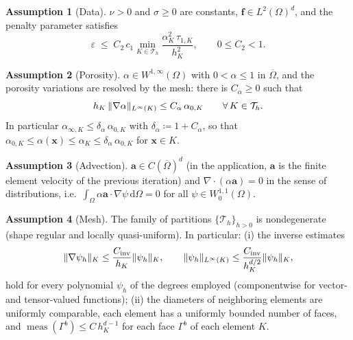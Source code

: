 \documentclass[11pt,a4paper]{article}
\newcommand{\ba}{\boldsymbol{a}}
\newcommand{\bff}{\boldsymbol{f}}
\newcommand{\Th}{\mathcal{T}_h}
\newcommand{\dd}{\,\mathrm{d}}
\newcommand{\Cinv}{C_{\mathrm{inv}}}
\DeclarePairedDelimiter{\norm}{\lVert}{\rVert}
\theoremstyle{plain}
\theoremstyle{remark}
\theoremstyle{definition}
\newtheorem{assumption}{Assumption}
\numberwithin{equation}{section}
\begin{document}
\begin{assumption}[Data]\label{H:data}
$\nu>0$ and $\sigma\ge 0$ are constants, $\bff\in L^2(\Omega)^d$, and the penalty
parameter satisfies
\begin{equation}\label{eq:epscond}
  \varepsilon \;\le\; C_2\, c_1 \min_{K\in\Th}
  \frac{\alpha_K^2\,\tau_{1,K}}{h_K^2},
  \qquad 0\le C_2<1 .
\end{equation}
\end{assumption}

\begin{assumption}[Porosity]\label{H:porosity}
$\alpha\in W^{1,\infty}(\Omega)$ with $0<\alpha\le 1$ in $\overline{\Omega}$, and the
porosity variations are resolved by the mesh: there is $C_\alpha\ge0$ such that
\begin{equation}\label{eq:resolved}
  h_K\,\norm{\nabla\alpha}_{L^\infty(K)} \le C_\alpha\,\alpha_{0,K}
  \qquad\forall\,K\in\Th .
\end{equation}
In particular $\alpha_{\infty,K}\le \delta_\alpha\,\alpha_{0,K}$ with
$\delta_\alpha\coloneqq 1+C_\alpha$, so that
$\alpha_{0,K}\le\alpha(\boldsymbol{x})\le\alpha_K\le\delta_\alpha\,\alpha_{0,K}$ for
$\boldsymbol{x}\in K$.
\end{assumption}

\begin{assumption}[Advection]\label{H:advection}
$\ba\in C(\overline{\Omega})^d$ (in the application, $\ba$ is the finite element velocity
of the previous iteration) and $\nabla\cdot(\alpha\ba)=0$ in the sense of distributions,
i.e.\ $\int_\Omega \alpha\ba\cdot\nabla\psi \dd\Omega = 0$ for all
$\psi\in W^{1,1}_0(\Omega)$.
\end{assumption}

\begin{assumption}[Mesh]\label{H:mesh}
The family of partitions $\{\Th\}_{h>0}$ is nondegenerate (shape regular and locally
quasi-uniform). In particular: (i) the inverse estimates
\begin{equation}\label{eq:inverse}
  \norm{\nabla\psi_h}_{K} \le \frac{\Cinv}{h_K}\norm{\psi_h}_{K},
  \qquad
  \norm{\psi_h}_{L^\infty(K)} \le \frac{\Cinv}{h_K^{d/2}}\norm{\psi_h}_{K},
\end{equation}
hold for every polynomial $\psi_h$ of the degrees employed (componentwise for vector- and
tensor-valued functions); (ii) the diameters of neighboring elements are uniformly
comparable, each element has a uniformly bounded number of faces, and
$\operatorname{meas}(\Gamma^b)\le C\,h_K^{d-1}$ for each face $\Gamma^b$ of each element
$K$.
\end{assumption}
\end{document}
